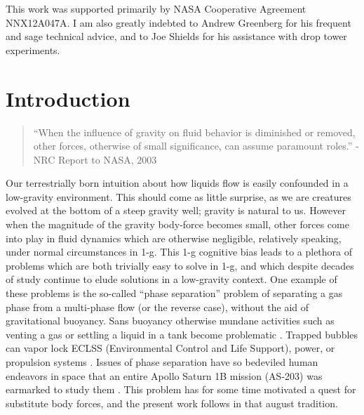 \documentclass[12pt,a4paper,oneside]{book}
\newcommand\blankpage{%
    \null
    \thispagestyle{empty}%
    \addtocounter{page}{-1}%
    \newpage}
\begin{document}
This work was supported primarily by NASA Cooperative Agreement NNX12A047A. I am also greatly indebted to Andrew Greenberg for his frequent and sage technical advice, and to Joe Shields for his assistance with drop tower experiments. \\ 
\vspace*{\fill}
\clearpage

\tableofcontents
\afterpage{\blankpage}
\listoffigures
\afterpage{\blankpage}

\mainmatter
\chapter{Introduction}
\begin{quote}
``When the influence of gravity on fluid behavior is diminished or removed, other forces, otherwise of small significance, can assume paramount roles.''
- NRC Report to NASA, 2003  \cite{motil_priorities_2012}
\end{quote}

Our terrestrially born intuition about how liquids flow is easily confounded in a low-gravity environment. This should come as little surprise, as we are creatures evolved at the bottom of a steep gravity well; gravity is natural to us. However when the magnitude of the gravity body-force becomes small, other forces come into play in fluid dynamics which are otherwise negligible, relatively speaking, under normal circumstances in 1-g. This 1-g cognitive bias leads to a plethora of problems which are both trivially easy to solve in 1-g, and which despite decades of study continue to elude solutions in a low-gravity context. One example of these problems is the so-called ``phase separation'' problem of separating a gas phase from a multi-phase flow (or the reverse case), without the aid of gravitational buoyancy. Sans buoyancy otherwise mundane activities such as venting a gas or settling a liquid in a tank become problematic \cite{petrash_controlling_1964}. Trapped bubbles can vapor lock ECLSS (Environmental Control and Life Support), power, or propulsion systems \cite{jenson_passive_2014}. Issues of phase separation have so bedeviled human endeavors in space that an entire Apollo Saturn 1B mission (AS-203) was earmarked to study them \cite{hastings_[saturn_1965}. This problem has for some time motivated a quest for substitute body forces, and the present work follows in that august tradition.
\end{document}

